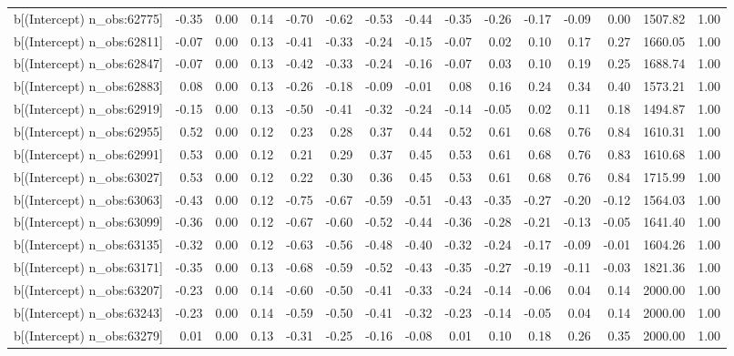 \begin{table}[ht]
\begin{tabular}{rrrrrrrrrrrrrrr}
  b[(Intercept) n\_obs:62775] & -0.35 & 0.00 & 0.14 & -0.70 & -0.62 & -0.53 & -0.44 & -0.35 & -0.26 & -0.17 & -0.09 & 0.00 & 1507.82 & 1.00 \\ 
  b[(Intercept) n\_obs:62811] & -0.07 & 0.00 & 0.13 & -0.41 & -0.33 & -0.24 & -0.15 & -0.07 & 0.02 & 0.10 & 0.17 & 0.27 & 1660.05 & 1.00 \\ 
  b[(Intercept) n\_obs:62847] & -0.07 & 0.00 & 0.13 & -0.42 & -0.33 & -0.24 & -0.16 & -0.07 & 0.03 & 0.10 & 0.19 & 0.25 & 1688.74 & 1.00 \\ 
  b[(Intercept) n\_obs:62883] & 0.08 & 0.00 & 0.13 & -0.26 & -0.18 & -0.09 & -0.01 & 0.08 & 0.16 & 0.24 & 0.34 & 0.40 & 1573.21 & 1.00 \\ 
  b[(Intercept) n\_obs:62919] & -0.15 & 0.00 & 0.13 & -0.50 & -0.41 & -0.32 & -0.24 & -0.14 & -0.05 & 0.02 & 0.11 & 0.18 & 1494.87 & 1.00 \\ 
  b[(Intercept) n\_obs:62955] & 0.52 & 0.00 & 0.12 & 0.23 & 0.28 & 0.37 & 0.44 & 0.52 & 0.61 & 0.68 & 0.76 & 0.84 & 1610.31 & 1.00 \\ 
  b[(Intercept) n\_obs:62991] & 0.53 & 0.00 & 0.12 & 0.21 & 0.29 & 0.37 & 0.45 & 0.53 & 0.61 & 0.68 & 0.76 & 0.83 & 1610.68 & 1.00 \\ 
  b[(Intercept) n\_obs:63027] & 0.53 & 0.00 & 0.12 & 0.22 & 0.30 & 0.36 & 0.45 & 0.53 & 0.61 & 0.68 & 0.76 & 0.84 & 1715.99 & 1.00 \\ 
  b[(Intercept) n\_obs:63063] & -0.43 & 0.00 & 0.12 & -0.75 & -0.67 & -0.59 & -0.51 & -0.43 & -0.35 & -0.27 & -0.20 & -0.12 & 1564.03 & 1.00 \\ 
  b[(Intercept) n\_obs:63099] & -0.36 & 0.00 & 0.12 & -0.67 & -0.60 & -0.52 & -0.44 & -0.36 & -0.28 & -0.21 & -0.13 & -0.05 & 1641.40 & 1.00 \\ 
  b[(Intercept) n\_obs:63135] & -0.32 & 0.00 & 0.12 & -0.63 & -0.56 & -0.48 & -0.40 & -0.32 & -0.24 & -0.17 & -0.09 & -0.01 & 1604.26 & 1.00 \\ 
  b[(Intercept) n\_obs:63171] & -0.35 & 0.00 & 0.13 & -0.68 & -0.59 & -0.52 & -0.43 & -0.35 & -0.27 & -0.19 & -0.11 & -0.03 & 1821.36 & 1.00 \\ 
  b[(Intercept) n\_obs:63207] & -0.23 & 0.00 & 0.14 & -0.60 & -0.50 & -0.41 & -0.33 & -0.24 & -0.14 & -0.06 & 0.04 & 0.14 & 2000.00 & 1.00 \\ 
  b[(Intercept) n\_obs:63243] & -0.23 & 0.00 & 0.14 & -0.59 & -0.50 & -0.41 & -0.32 & -0.23 & -0.14 & -0.05 & 0.04 & 0.14 & 2000.00 & 1.00 \\ 
  b[(Intercept) n\_obs:63279] & 0.01 & 0.00 & 0.13 & -0.31 & -0.25 & -0.16 & -0.08 & 0.01 & 0.10 & 0.18 & 0.26 & 0.35 & 2000.00 & 1.00 \\ 

\end{tabular}
\end{table}
